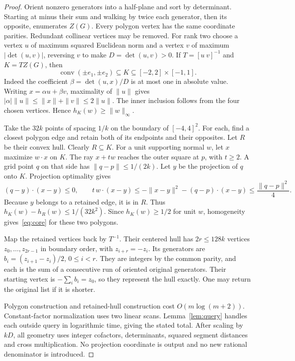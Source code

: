 \documentclass[11pt]{article}
\begin{document}
\begin{proof}
Orient nonzero generators into a half-plane and sort by determinant. Starting
at minus their sum and walking by twice each generator, then its opposite,
enumerates $Z(G)$. Every polygon vertex has the same coordinate parities.
Redundant collinear vertices may be removed. For rank two choose a vertex $u$
of maximum squared Euclidean norm and a vertex $v$ of maximum
$|\det(u,v)|$, reversing $v$ to make $D=\det(u,v)>0$. If
$T=[u\ v]^{-1}$ and $K=TZ(G)$, then
\begin{equation}\label{eq:normalization}
 \operatorname{conv}(\pm e_1,\pm e_2)\subseteq K
 \subseteq[-2,2]\times[-1,1].
\end{equation}
Indeed the coefficient $\beta=\det(u,x)/D$ is at most one in absolute
value. Writing $x=\alpha u+\beta v$, maximality of $\|u\|$ gives
$|\alpha|\|u\|\leq\|x\|+\|v\|\leq2\|u\|$. The inner inclusion follows
from the four chosen vertices. Hence $h_K(w)\geq\|w\|_\infty$.

Take the $32k$ points of spacing $1/k$ on the boundary of $[-4,4]^2$.
For each, find a closest polygon edge and retain both of its endpoints and
their opposites. Let $R$ be their convex hull. Clearly $R\subseteq K$.
For a unit supporting normal $w$, let $x$ maximize $w\cdot x$ on $K$.
The ray $x+tw$ reaches the outer square at $p$, with $t\geq2$.
A grid point $q$ on that side has $\|q-p\|\leq1/(2k)$.
Let $y$ be the projection of $q$ onto $K$. Projection optimality gives
\[
 (q-y)\cdot(x-y)\leq0,\qquad
 t\,w\cdot(x-y)\leq-\|x-y\|^2-(q-p)\cdot(x-y)
 \leq\frac{\|q-p\|^2}{4}.
\]
Because $y$ belongs to a retained edge, it is in $R$. Thus
$h_K(w)-h_R(w)\leq1/(32k^2)$. Since $h_K(w)\geq1/2$ for unit $w$,
homogeneity gives~\eqref{eq:core} for these two polygons.

Map the retained vertices back by $T^{-1}$. Their centered hull has
$2r\leq128k$ vertices $z_0,\ldots,z_{2r-1}$ in boundary order, with
$z_{i+r}=-z_i$. Its generators are
$b_i=(z_{i+1}-z_i)/2$, $0\leq i<r$. They are integers by the common parity,
and each is the sum of a consecutive run of oriented original generators.
Their starting vertex is $-\sum_i b_i=z_0$, so they represent the hull
exactly. One may return the original list if it is shorter.

Polygon construction and retained-hull construction cost $O(m\log(m+2))$.
Constant-factor normalization uses two linear scans. Lemma~\ref{lem:query}
handles each outside query in logarithmic time, giving the stated total.
After scaling by $kD$, all geometry uses integer cofactors, determinants,
squared segment distances and cross multiplication. No projection coordinate
is output and no new rational denominator is introduced.
\end{proof}
\end{document}
